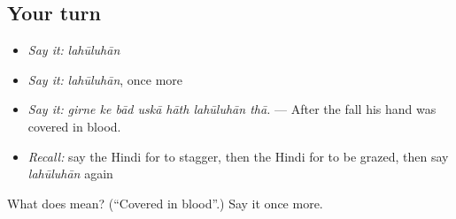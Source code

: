 \subsection*{Your turn}
\begin{itemize}
\raggedright
  \item \emph{Say it:} \emph{lahūluhān}
  \item \emph{Say it:} \emph{lahūluhān}, once more
  \item \emph{Say it:} \emph{girne ke bād uskā hāth lahūluhān thā.} — After the fall his hand was covered in blood.
  \item \emph{Recall:} say the Hindi for to stagger, then the Hindi for to be grazed, then say \emph{lahūluhān} again
\end{itemize}

\begin{tcolorbox}[breakable,colback=teal!4,colframe=teal!35!black,title={Before you move on}]
What does  mean? (\textquotedblleft{}Covered in blood\textquotedblright{}.) Say it once more.
\end{tcolorbox}
